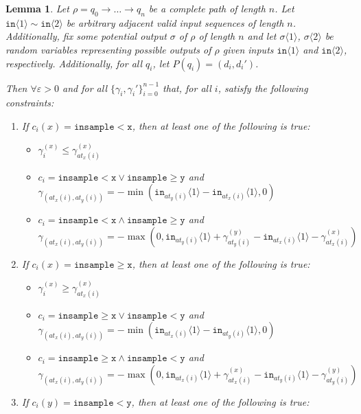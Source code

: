 \documentclass[12pt]{article}
\newcommand{\gguard}[1][x]{\texttt{insample}\geq #1}
\newcommand{\lguard}[1][x]{\texttt{insample} < #1}
\newcommand{\brangle}[1]{\langle #1 \rangle}
\newtheorem{lemma}[thm]{Lemma}
\theoremstyle{definition}
\begin{document}
\begin{lemma}
    Let $\rho = q_0\to \ldots \to q_n$ be a complete path of length $n$. 
    Let $\texttt{in}\brangle{1}\sim \texttt{in}\brangle{2}$ be arbitrary adjacent valid input sequences of length $n$. Additionally, fix some potential output $\sigma$ of $\rho$ of length $n$ and let $\sigma\brangle{1}$, $\sigma\brangle{2}$ be random variables representing possible outputs of $\rho$ given inputs $\texttt{in}\brangle{1}$ and $\texttt{in}\brangle{2}$, respectively. Additionally, for all $q_i$, let $P(q_i) = (d_i, d_i')$.

    Then $\forall \varepsilon>0$ and for all $\{\gamma_i, \gamma_i'\}_{i=0}^{n-1}$ that, for all $i$, satisfy the following constraints:\begin{enumerate}
        \item If $c_i(x) = \lguard[\texttt{x}]$, then at least one of the following is true: \begin{itemize}
            \item $\gamma_i^{(x)}\leq \gamma^{(x)}_{at_x(i)}$
            \item $c_i = \lguard[\texttt{x}]\lor\gguard[\texttt{y}]$ and $\gamma_{(at_x(i), at_y(i))} = -\min(\texttt{in}_{at_y(i)}\brangle{1}-\texttt{in}_{at_x(i)}\brangle{1}, 0)$
            \item $c_i = \lguard[\texttt{x}]\land\gguard[\texttt{y}]$ and $\gamma_{(at_x(i), at_y(i))} = -\max(0, \texttt{in}_{at_y(i)}\brangle{1}+ \gamma_{at_y(i)}^{(y)}-\texttt{in}_{at_x(i)}\brangle{1}-\gamma_{at_x(i)}^{(x)})$
        \end{itemize}
        \item If $c_i(x) = \gguard[\texttt{x}]$, then at least one of the following is true: \begin{itemize}
            \item $\gamma_i^{(x)}\geq \gamma^{(x)}_{at_x(i)}$
            \item $c_i = \gguard[\texttt{x}]\lor\lguard[\texttt{y}]$ and $\gamma_{(at_x(i), at_y(i))} = -\min(\texttt{in}_{at_x(i)}\brangle{1}-\texttt{in}_{at_y(i)}\brangle{1}, 0)$
            \item $c_i = \gguard[\texttt{x}]\land\lguard[\texttt{y}]$ and $\gamma_{(at_x(i), at_y(i))} = -\max(0, \texttt{in}_{at_x(i)}\brangle{1}+ \gamma_{at_x(i)}^{(x)}-\texttt{in}_{at_y(i)}\brangle{1}-\gamma_{at_y(i)}^{(y)})$
        \end{itemize}
        \item If $c_i(y) = \lguard[\texttt{y}]$, then at least one of the following is true: \begin{itemize}

\end{itemize}
\end{enumerate}
\end{lemma}
\end{document}
